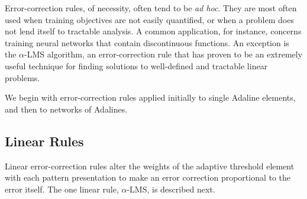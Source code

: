 \documentclass[10pt,twocolumn]{article}
\begin{document}
Error-correction rules, of necessity, often tend to be \textit{ad hoc}. They are
most often used when training objectives are not easily quantified, or when a
problem does not lend itself to tractable analysis. A common application, for
instance, concerns training neural networks that contain discontinuous functions.
An exception is the $\alpha$-LMS algorithm, an error-correction rule that has
proven to be an extremely useful technique for finding solutions to well-defined
and tractable linear problems.

We begin with error-correction rules applied initially to single Adaline
elements, and then to networks of Adalines.

\subsection{Linear Rules}
Linear error-correction rules alter the weights of the adaptive threshold element
with each pattern presentation to make an error correction proportional to the
error itself. The one linear rule, $\alpha$-LMS, is described next.
\end{document}
